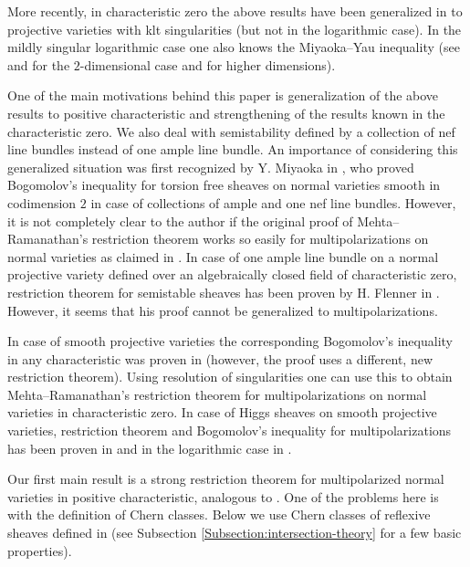 \documentclass[12pt]{article}
\theoremstyle{plain}
\theoremstyle{definition}
\theoremstyle{remark}
\begin{document}
More recently, in characteristic zero the above results have been generalized in \cite{GKPT2}
to projective varieties with klt singularities (but not in the logarithmic case). In the  mildly singular logarithmic case one also knows the Miyaoka--Yau inequality (see \cite[Chapter 10]{Ko} and \cite{La0} for the $2$-dimensional case and \cite{GT} for higher dimensions).


\medskip

One of the main motivations behind this paper is generalization of the above results to positive characteristic and strengthening of the results known in the characteristic zero. We also deal with semistability defined by a collection of nef line bundles instead of one ample line bundle. An importance of considering this generalized situation was first recognized by
Y. Miyaoka in \cite{Mi}, who proved Bogomolov's inequality for torsion free sheaves on normal 
varieties smooth in codimension $2$ in case of collections of ample and one nef line bundles.
However, it is not completely clear to the author if the original proof of Mehta--Ramanathan's restriction theorem works so easily for multipolarizations on normal varieties as claimed in \cite[Corollary 3.13]{Mi}. In case of one ample line bundle on a normal projective variety defined over an algebraically closed field of characteristic zero, restriction theorem for semistable sheaves has been proven by H. Flenner in \cite{Fl}. However, it seems that his proof cannot be generalized to multipolarizations. 

In case of smooth projective varieties the corresponding Bogomolov's inequality in any characteristic was proven in \cite{La1} (however, the proof uses a different, new restriction theorem).
Using resolution of singularities one can use this to obtain Mehta--Ramanathan's restriction theorem 
for multipolarizations on normal varieties in characteristic zero. 
In case of Higgs sheaves on smooth projective varieties, restriction theorem and Bogomolov's inequality for multipolarizations has been proven in \cite{La3} and in the logarithmic case in \cite{La4}.

\medskip

Our first main result is a strong restriction theorem for multipolarized normal varieties in positive characteristic, analogous to \cite[Theorem 5.2 and Corollary 5.4]{La1}. One of the problems here is with the definition of Chern classes. Below we use Chern classes of reflexive sheaves defined in \cite{La-Chern} (see Subsection \ref{Subsection:intersection-theory} for a few basic properties). 
\end{document}
